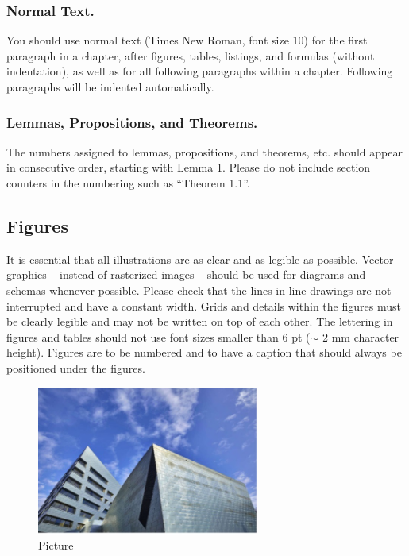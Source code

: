 \documentclass{llncs}
\begin{document}
\subsubsection{Normal Text.}
You should use normal text (Times New Roman, font size 10) for the first paragraph in a chapter, after figures, tables, listings, and formulas (without indentation), as well as for all following paragraphs within a chapter. 
Following paragraphs will be indented automatically.

\subsubsection{Lemmas, Propositions, and Theorems.}
The numbers assigned to lemmas, propositions, and theorems, etc. should appear in consecutive order, starting with Lemma 1. 
Please do not include section counters in the numbering such as “Theorem 1.1”.

\subsection{Figures} 
It is essential that all illustrations are as clear and as legible as possible. 
Vector graphics – instead of rasterized images – should be used for diagrams and schemas whenever possible. 
Please check that the lines in line drawings are not interrupted and have a constant width. 
Grids and details within the figures must be clearly legible and may not be written on top of each other. 
The lettering in figures and tables should not use font sizes smaller than 6 pt ($\sim$ 2 mm character height). 
Figures are to be numbered and to have a caption that should always be positioned under the figures.

\begin{figure}[htp]
    \centering
    \includegraphics[width=0.65\textwidth]{figures/image.JPG}
    \caption{Picture}
    \label{fig:my_label}
\end{figure}
\end{document}

